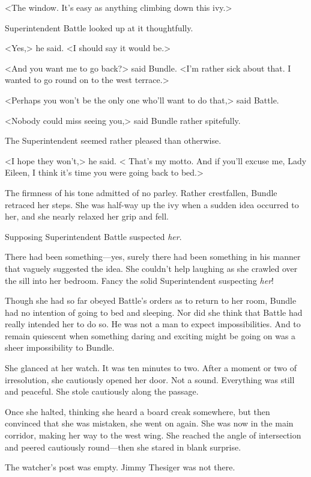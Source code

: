 <The window. It's easy as anything climbing down this ivy.>

Superintendent Battle looked up at it thoughtfully.

<Yes,> he said. <I should say it would be.>

<And you want me to go back?> said Bundle. <I'm rather sick about that. I wanted to go round on to the west terrace.>

<Perhaps you won't be the only one who'll want to do that,> said Battle.

<Nobody could miss seeing you,> said Bundle rather spitefully.

The Superintendent seemed rather pleased than otherwise.

<I hope they won't,> he said. < That's my motto. And if you'll excuse me, Lady Eileen, I think it's time you were going back to bed.>

The firmness of his tone admitted of no parley. Rather crestfallen, Bundle retraced her steps. She was half-way up the ivy when a sudden idea occurred to her, and she nearly relaxed her grip and fell.

Supposing Superintendent Battle suspected \emph{her}.

There had been something—yes, surely there had been something in his manner that vaguely suggested the idea. She couldn't help laughing as she crawled over the sill into her bedroom. Fancy the solid Superintendent suspecting \emph{her}!

Though she had so far obeyed Battle's orders as to return to her room, Bundle had no intention of going to bed and sleeping. Nor did she think that Battle had really intended her to do so. He was not a man to expect impossibilities. And to remain quiescent when something daring and exciting might be going on was a sheer impossibility to Bundle.

She glanced at her watch. It was ten minutes to two. After a moment or two of irresolution, she cautiously opened her door. Not a sound. Everything was still and peaceful. She stole cautiously along the passage.

Once she halted, thinking she heard a board creak somewhere, but then convinced that she was mistaken, she went on again. She was now in the main corridor, making her way to the west wing. She reached the angle of intersection and peered cautiously round—then she stared in blank surprise.

The watcher's post was empty. Jimmy Thesiger was not there.

